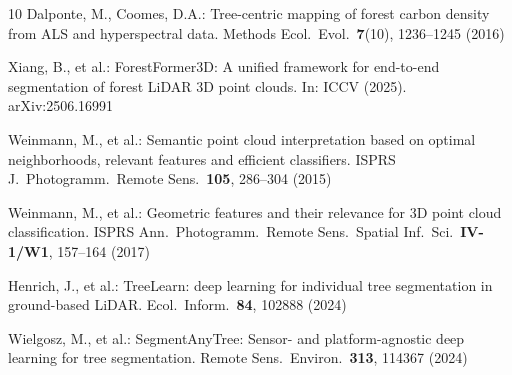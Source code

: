 \documentclass[runningheads]{llncs}
\begin{document}
\begin{thebibliography}{10}
Dalponte, M., Coomes, D.A.:
Tree-centric mapping of forest carbon density from ALS and hyperspectral data.
Methods Ecol.\ Evol.\ \textbf{7}(10), 1236--1245 (2016)

Xiang, B., et al.:
ForestFormer3D: A unified framework for end-to-end segmentation of forest LiDAR 3D point clouds.
In: ICCV (2025). arXiv:2506.16991

Weinmann, M., et al.:
Semantic point cloud interpretation based on optimal neighborhoods, relevant features and efficient classifiers.
ISPRS J.\ Photogramm.\ Remote Sens.\ \textbf{105}, 286--304 (2015)

Weinmann, M., et al.:
Geometric features and their relevance for 3D point cloud classification.
ISPRS Ann.\ Photogramm.\ Remote Sens.\ Spatial Inf.\ Sci.\ \textbf{IV-1/W1}, 157--164 (2017)


Henrich, J., et al.:
TreeLearn: deep learning for individual tree segmentation in ground-based LiDAR.
Ecol.\ Inform.\ \textbf{84}, 102888 (2024)

Wielgosz, M., et al.:
SegmentAnyTree: Sensor- and platform-agnostic deep learning for tree segmentation.
Remote Sens.\ Environ.\ \textbf{313}, 114367 (2024)


\end{thebibliography}
\end{document}
